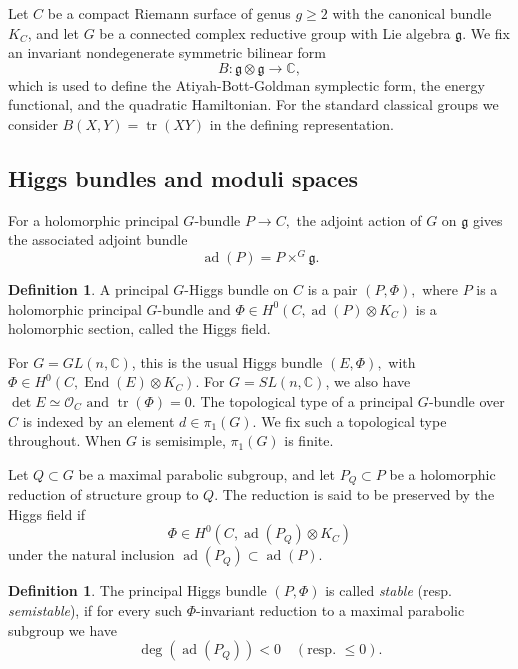 \documentclass[11pt,reqno]{amsart}
\numberwithin{equation}{section}
\theoremstyle{plain}
\theoremstyle{definition}
\newtheorem{definition}[theorem]{Definition}
\theoremstyle{remark}
\begin{document}
Let \(C\) be a compact Riemann surface of genus \(g\geq 2\) with the canonical bundle $K_C$, and let \(G\) be a connected complex reductive group with Lie algebra
\(\mathfrak g\). We fix an invariant nondegenerate symmetric bilinear form
\[
        B:\mathfrak g\otimes\mathfrak g\longrightarrow\mathbb C,
\]
which is used to define the
Atiyah-Bott-Goldman symplectic form, the energy functional, and the quadratic
Hamiltonian. For the
standard classical groups we consider $B(X,Y)=\operatorname{tr}(XY)$
in the defining representation.


\subsection{Higgs bundles and moduli spaces}
For a holomorphic principal \(G\)-bundle $P\longrightarrow C,$
the adjoint action of \(G\) on \(\mathfrak g\) gives the associated adjoint
bundle
\[
        \operatorname{ad}(P)
        =
        P\times^G\mathfrak g .
\]

\begin{definition}
A principal \(G\)-Higgs bundle on \(C\) is a pair
\(
        (P,\Phi),
\)
where \(P\) is a holomorphic principal \(G\)-bundle and
\(
        \Phi\in H^0(C,\operatorname{ad}(P)\otimes K_C)
\)
is a holomorphic section, called the Higgs field.
\end{definition}

For \(G=GL(n,\mathbb C)\), this is the usual Higgs bundle
\(
        (E,\Phi),
\) with
\(
        \Phi\in H^0(C,\operatorname{End}(E)\otimes K_C).
\) 
For \(G=SL(n,\mathbb C)\), we also have
\(
        \det E\simeq\mathcal O_C \text{ and }
        \operatorname{tr}(\Phi)=0.
\)
The topological type of a principal \(G\)-bundle over \(C\) is indexed by an
element
\(
        d\in \pi_1(G).
\)
We fix such a topological type throughout. When \(G\) is semisimple,
\(\pi_1(G)\) is finite.

Let \(Q\subset G\) be a
maximal parabolic subgroup, and let
\(
        P_Q\subset P
\)
be a holomorphic reduction of structure group to \(Q\). The reduction is said
to be preserved by the Higgs field if
\[
        \Phi\in H^0(C,\operatorname{ad}(P_Q)\otimes K_C)
\]
under the natural inclusion
\(
        \operatorname{ad}(P_Q)\subset \operatorname{ad}(P).
\)

\begin{definition}
The principal Higgs bundle \((P,\Phi)\) is called \textit{stable} (resp. \textit{semistable}), if
for every such \(\Phi\)-invariant reduction to a maximal parabolic subgroup we have
\[
    \deg(\operatorname{ad}(P_Q))<0
        \quad
        (\text{resp. } \leq 0).
\]
\end{definition}
\end{document}
